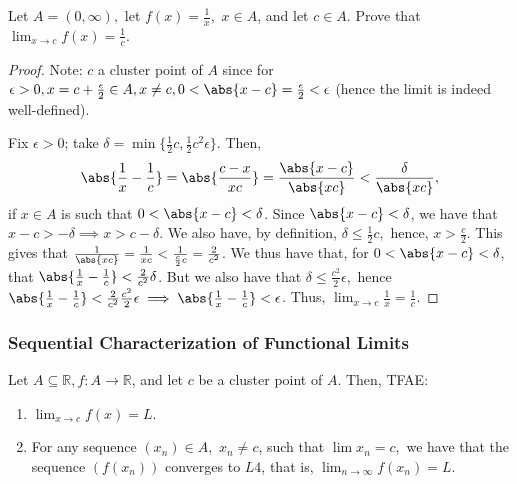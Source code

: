 \documentclass[12pt]{article}
\begin{document}
\begin{example}
  Let $A = (0, \infty),$ let $f(x) = \frac{1}{x},$ $x \in A$, and let $c \in A$. Prove that $\lim_{x\to c} f(x) = \frac{1}{c}$.
  \begin{proof}
    Note: $c$ a cluster point of $A$ since for $\epsilon > 0, x = c + \frac{\epsilon}{2} \in A, x \neq c, 0 < \abs{x - c} = \frac{\epsilon}{2} < \epsilon$ (hence the limit is indeed well-defined).

    Fix $\epsilon > 0$; take $\delta = \min \{\frac{1}{2}c, \frac{1}{2}c^2\epsilon\}$. Then, \begin{align*}
      \abs{\frac{1}{x} - \frac{1}{c}} = \abs{\frac{c-x}{xc}} = \frac{\abs{x - c}}{\abs{xc}}< \frac{\delta}{\abs{xc}},
    \end{align*}
    if $x \in A$ is such that $0 < \abs{x - c} < \delta$. Since $\abs{x - c} < \delta$, we have that $x -c > - \delta \implies x > c - \delta$. We also have, by definition, $\delta \leq \frac{1}{2} c,$ hence, $x > \frac{c}{2}$. This gives that $\frac{1}{\abs{xc}} = \frac{1}{xc} < \frac{1}{\frac{c}{2}c} = \frac{2}{c^2}$. We thus have that, for $0 < \abs{x - c} < \delta$, that $\abs{\frac{1}{x} - \frac{1}{c}} < \frac{2}{c^2}\delta$. But we also have that $\delta \leq \frac{c^2}{2}\epsilon,$ hence $\abs{\frac{1}{x} - \frac{1}{c}}< \frac{2}{c^2} \frac{c^2}{2}\epsilon \implies \abs{\frac{1}{x} - \frac{1}{c}} < \epsilon$. Thus, $\lim_{x\to c} \frac{1}{x} = \frac{1}{c}$.
  \end{proof}
\end{example}

\subsubsection{Sequential Characterization of Functional Limits}

\begin{theorem}\label{thm:sequentialfunctionallimit}
  Let $A \subseteq \mathbb{R}, f : A \to \mathbb{R}$, and let $c$ be a cluster point of $A$. Then, TFAE:
  \begin{enumerate}
    \item $\lim_{x\to c}f(x) = L$.
    \item For any sequence $(x_n) \in A,$ $x_n \neq c$, such that $\lim x_n = c,$ we have that the sequence $(f(x_n))$ converges to $L4$, that is, $\lim_{n\to\infty} f(x_n) = L$.
  \end{enumerate}
\end{theorem}
\end{document}
